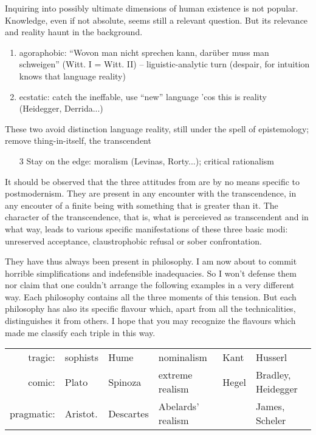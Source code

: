 {Inquiring into possibly ultimate dimensions of human existence is not popular.
Knowledge, even if not absolute, seems still a relevant question. But its relevance
and reality haunt in the background.
\begin{enumerate}
\item agoraphobic: ``Wovon man nicht sprechen kann, dar\"{u}ber muss man schweigen'' 
   (Witt. I = Witt. II) -- liguistic-analytic turn (despair, for intuition knows
that language \isnt reality)
\item ecstatic: catch the ineffable, use ``new'' language 'cos this is reality 
 (Heidegger, Derrida...)
\end{enumerate}
These two avoid distinction language \isnt reality, still under the spell of
epistemology; remove thing-in-itself, the transcendent
\begin{enumerate}
\item[3] Stay on the edge: moralism (Levinas, Rorty...); critical rationalism
\end{enumerate}
 
\subpa
It should be observed that the three
attitudes from  are by no means specific to 
postmodernism. They 
are present in any encounter with the transcendence, in any encouter of a 
finite being with something that is greater than it. The character of the 
transcendence, that is, what is perceieved as transcendent and in what way, 
leads to various specific manifestations of these three basic modi: unreserved 
acceptance, claustrophobic refusal or sober confrontation.

They have thus always been present in philosophy. I am now about to commit
horrible simplifications and indefensible inadequacies. So I won't defense them nor 
claim that one 
couldn't arrange the following examples in a very different way. 
Each philosophy contains all the three moments of this tension. But each philosophy has
also its specific flavour which, apart from all the technicalities,
distinguishes it 
from others. I hope 
that you may recognize the flavours which made me classify each triple in this
way.

\begin{tabular}{rlllll}
tragic:  &  sophists & Hume &      nominalism        & Kant  & Husserl  \\
comic:   & Plato  &    Spinoza &   extreme realism   & Hegel & Bradley, Heidegger \\
pragmatic:& Aristot. &  Descartes & Abelards' realism  &     &  James, Scheler
\end{tabular}


}

